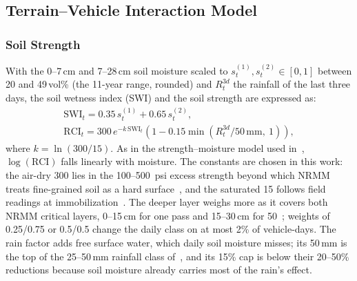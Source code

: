 \documentclass[conference]{IEEEtran}
\begin{document}
\subsection{Terrain--Vehicle Interaction Model}

\subsubsection{Soil Strength}
With the 0--7\,cm and 7--28\,cm soil moisture scaled to $s^{(1)}_t, s^{(2)}_t \in [0,1]$ between
20 and 49\,vol\% (the 11-year range, rounded) and $R^{3d}_t$ the rainfall of the last three days, the soil wetness index (SWI) and the soil
strength are expressed as:
\begin{gather}
  \mathrm{SWI}_t = 0.35\,s^{(1)}_t + 0.65\,s^{(2)}_t , \\
  \mathrm{RCI}_t = 300\,e^{-k\,\mathrm{SWI}_t}
  \left(1 - 0.15\min\!\left(R^{3d}_t / 50\,\mathrm{mm},\ 1\right)\right),
  \label{eq:rci}
\end{gather}
where $k = \ln(300/15)$. As in the strength--moisture model used in~\cite{liu2025},
$\log(\mathrm{RCI})$ falls linearly with moisture. The constants are chosen in this work: the air-dry 300 lies in
the 100--500\, psi excess strength beyond which NRMM treats fine-grained soil as a hard
surface~\cite{haley1979}, and the saturated 15 follows field readings at
immobilization~\cite{rosca2018}. The deeper layer weighs more as it covers both NRMM critical
layers, 0--15\,cm for one pass and 15--30\,cm for 50~\cite{haley1979}; weights of 0.25/0.75 or
0.5/0.5 change the daily class on at most 2\% of vehicle-days. The rain factor adds free surface
water, which daily soil moisture misses; its 50\,mm is the top of the 25--50\,mm rainfall class
of~\cite{liu2025}, and its 15\% cap is below their 20--50\% reductions because soil moisture
already carries most of the rain's effect.
\end{document}
